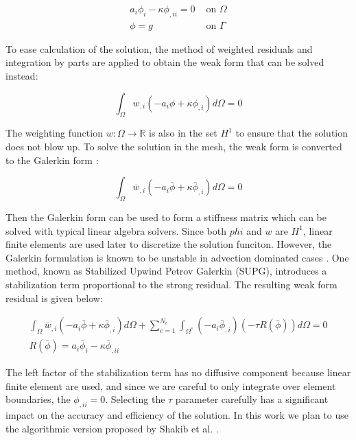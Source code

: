 \documentclass[12pt]{article}
\begin{document}
\begin{equation}
	\begin{split}
		a_i\phi_i - \kappa\phi_{,ii} = 0 & \text{ on } \Omega \\
		\phi = g & \text{ on } \Gamma
	\end{split}
\end{equation}

To ease calculation of the solution, the method of weighted residuals and
integration by parts are applied to obtain the weak form that can be solved
instead:

\begin{equation}
	\int_\Omega w_{,i}\left(-a_i\phi + \kappa\phi_{,i}\right) d\Omega = 0
\end{equation}

The weighting function \(w : \Omega \to \mathbb{R}\) is also in the set
\(H^1\) to ensure that the solution does not blow up. To solve the solution
in the mesh, the weak form is converted to the Galerkin form
\cite{hughes-1987}:

\begin{equation}
	\int_\Omega \bar{w}_{,i}(-a_i\bar{\phi} + \kappa\bar{\phi}_{,i}) d\Omega
	= 0
\end{equation}

Then the Galerkin form can be used to form a stiffness matrix which can be
solved with typical linear algebra solvers. Since both \(phi\) and \(w\) are
\(H^1\), linear finite elements are used later to discretize the solution
funciton. However, the Galerkin formulation is known to be unstable in
advection dominated cases \cite{hughes-2010}. One method, known as Stabilized
Upwind Petrov Galerkin (SUPG), introduces a stabilization term proportional
to the strong residual. The resulting weak form residual is given below:

\begin{equation}
	\begin{split}
		\int_\Omega
			\bar{w}_{,i}(-a_i\bar{\phi} + \kappa\bar{\phi}_{,i}) d\Omega
		+ \sum_{e=1}^{N_e}
			\int_{\Omega^e} (-a_i\bar{\phi}_{,i})(-\tau R(\bar{\phi})) d\Omega
		= 0 \\
		R(\bar{\phi}) = a_i\bar{\phi}_i-\kappa\bar{\phi}_{,ii}
	\end{split}
\end{equation}

The left factor of the stabilization term has no diffusive component because
linear finite element are used, and since we are careful to only integrate
over element boundaries, the \(\phi_{,ii} = 0\). Selecting the \(\tau\)
parameter carefully has a significant impact on the accuracy and efficiency
of the solution. In this work we plan to use the algorithmic version proposed
by Shakib et al. \cite{shakib-1991}.
\end{document}
